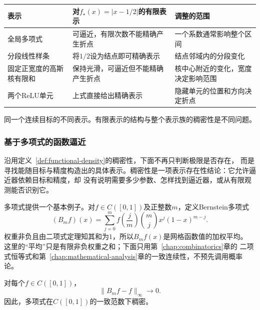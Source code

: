 \begin{fullwidth}
\begin{minipage}{\linewidth}
 \centering\small
 \begin{tabularx}{\linewidth}{@{}lXX@{}}
 \toprule
 表示 & 对$f_\star(x)=|x-1/2|$的有限表示 & 调整的范围\\
 \midrule
 全局多项式 & 可逼近，有限次数不能精确产生折点 & 一个系数通常影响整个区间\\
 分段线性样条 & 将$1/2$设为结点即可精确表示 & 结点邻域内的分段变化\\
 固定正宽度的高斯核有限和 & 保持光滑，可逼近但不能精确产生折点 & 核中心附近的变化，宽度决定影响范围\\
 两个ReLU单元 & 上式直接给出精确表示 & 隐藏单元的位置和方向决定折点\\
 \bottomrule
 \end{tabularx}
   {同一个连续目标的不同表示。有限表示的结构与整个表示族的稠密性是不同问题。}
\end{minipage}
\end{fullwidth}


\subsubsection{基于多项式的函数逼近}
\label{sec:functional-polynomial-approximation}

沿用定义~\ref{def:functional-density}的稠密性，下面不再只判断极限是否存在，
而是寻找能随目标与精度构造出的具体表示。稠密性是一项表示存在性结论：它允许逼近器依赖目标和精度，却
没有说明需要多少参数、怎样找到逼近器，或从有限观测能否识别它。

多项式提供一个基本例子。对$f\in C([0,1])$及正整数$m$，定义Bernstein多项式
\begin{equation}
  (B_mf)(x)
  =
  \sum_{j=0}^{m}
  f\left(\frac{j}{m}\right)
\binom{m}{j}x^j(1-x)^{m-j}.
  \label{eq:functional-bernstein-polynomial}
\end{equation}
权重非负且由二项式定理知其和为$1$，所以$B_mf(x)$是网格函数值的加权平均。
这里的“平均”只是有限非负权重之和；下面只用第~\ref{chap:combinatorics}章的
二项式恒等式和第~\ref{chap:mathematical-analysis}章的一致连续性，不预先调用概率论。

\begin{theorem}[Bernstein逼近定理]
\label{thm:functional-weierstrass-bernstein}
对每个$f\in C([0,1])$，
\[
  \lVert B_mf-f\rVert_{\infty}\longrightarrow0.
\]
因此，多项式在$C([0,1])$的一致范数下稠密。
\end{theorem}

